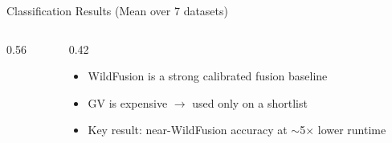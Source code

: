 \documentclass[aspectratio=169]{beamer}
\begin{document}
\begin{frame}{Classification Results (Mean over 7 datasets)}
  \begin{columns}[T,totalwidth=\textwidth]
    \begin{column}{0.56\textwidth}
      \centering
      \large
    \end{column}
    \begin{column}{0.42\textwidth}
      \Large
      \begin{itemize}
        \item WildFusion is a strong calibrated fusion baseline
        \item GV is expensive $\rightarrow$ used only on a shortlist
        \item Key result: near-WildFusion accuracy at $\sim$5$\times$ lower runtime
      \end{itemize}
    \end{column}
  \end{columns}
\end{frame}
\end{document}
